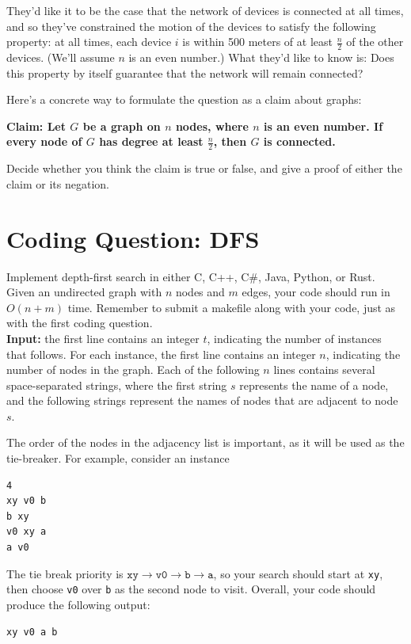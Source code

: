 \documentclass[solutionorbox, answers]{exam}
\begin{document}
\begin{questions}
They'd like it to be the case that the network of devices is connected at all times, and so they've constrained the motion of the devices to satisfy the following property: at all times, each device $i$ is within 500 meters of at least $\frac{n}{2}$ of the other devices. (We'll assume $n$ is an even number.) What they'd like to know is: Does this property by itself guarantee that the network will remain connected? 

Here’s a concrete way to formulate the question as a claim about graphs:

\textbf{Claim: Let $G$ be a graph on $n$ nodes, where $n$ is an even number. If every node of $G$ has degree at least $\frac{n}{2}$, then $G$ is connected.}

Decide whether you think the claim is true or false, and give a proof of either the claim or its negation. 

\begin{solutionbox}{} \vspace{1em}    
  \end{solutionbox}

  \pagebreak

\section*{Coding Question: DFS}
\question
Implement depth-first search in either C, C++, C\#, Java, Python, or Rust. Given an undirected graph with $n$ nodes and $m$ edges, your code should run in $O(n + m)$ time. Remember to submit a makefile along with your code, just as with the first coding question.\\

\textbf{Input:} the first line contains an integer $t$, indicating the number of instances that follows. For each instance, the first line contains an integer $n$, indicating the number of nodes in the graph. Each of the following $n$ lines contains several space-separated strings, where the first string $s$ represents the name of a node, and the following strings represent the names of nodes that are adjacent to node $s$.

The order of the nodes in the adjacency list is important, as it will be used as the tie-breaker. 
For example, consider an instance
\begin{verbatim}
4
xy v0 b
b xy
v0 xy a
a v0
\end{verbatim}
The tie break priority is $\texttt{xy} \to \texttt{v0} \to \texttt{b} \to \texttt{a}$, so your 
search should start at \texttt{xy}, then choose \texttt{v0} over \texttt{b} as the second node to visit.
Overall, your code should produce the following output:
\begin{verbatim}
xy v0 a b
\end{verbatim}


\end{questions}
\end{document}

